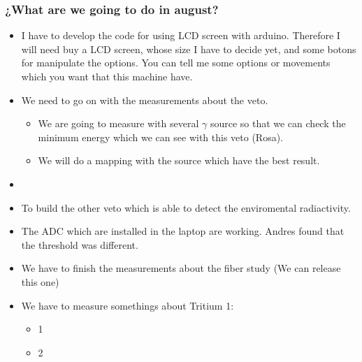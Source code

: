 \documentclass{beamer}
\begin{document}
\begin{frame}
\frametitle{¿What are we going to do in august?}
\begin{itemize}

\item{} I have to develop the code for using LCD screen with arduino. Therefore I will need buy a LCD screen, whose size I have to decide yet, and some botons for manipulate the options. You can tell me some options or movements which you want that this machine have. 

\item {} We need to go on with the measurements about the veto.

\begin{itemize}
\item{} We are going to measure with several $\gamma$ source so that we can check the minimum energy which we can see with this veto (Rosa).

\item {} We will do a mapping with the source which have the best result.
\end{itemize}
\item{}  

\item{} To build the other veto which is able to detect the enviromental radiactivity.

\item{} The ADC which are installed in the laptop are working. Andres found that the threshold was different.

\item{} We have to finish the measurements about the fiber study (We can release this one)

\item{} We have to measure somethings about Tritium 1:

\begin{itemize}

\item{} 1
\item{} 2

\end{itemize}



\end{itemize}

\end{frame}
\end{document}
